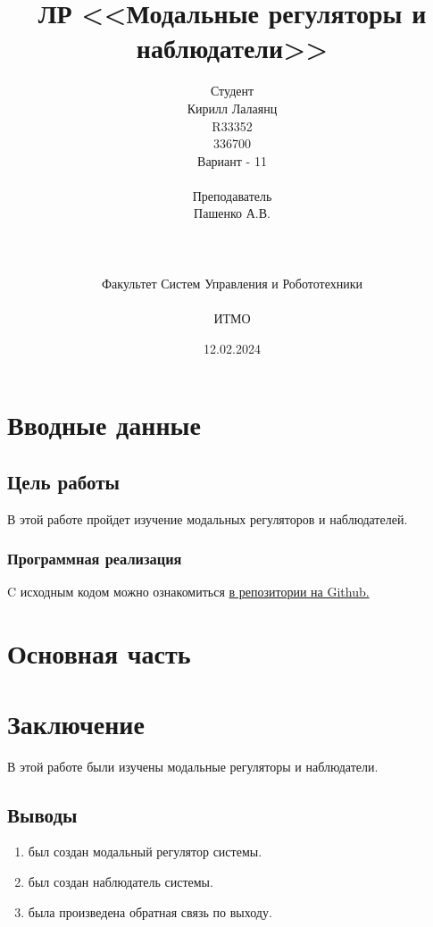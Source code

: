 \documentclass[16pt]{article}
\title{ЛР \textnumero 8 <<Модальные регуляторы и наблюдатели>>}
\author{
Студент \\
Кирилл Лалаянц\\
R33352\\
336700\\
Вариант - 11\\
\\
Преподаватель\\
Пашенко А.В. \\
\\
\\
\\
Факультет Систем Управления и Робототехники\\
\\
ИТМО\\
}
\date{12.02.2024}
\begin{document}
\maketitle
\newpage
\tableofcontents
\thispagestyle{empty}

\newpage
\setcounter{page}{1}
\section{Вводные данные}
\subsection{Цель работы}
В этой работе пройдет изучение модальных регуляторов и наблюдателей.


\subsubsection{Программная реализация}
C исходным кодом можно ознакомиться \href{https://github.com/lalayants/control-theory-itmo-2023-2024}{в репозитории на Github.}
\newpage
\section{Основная часть}

\FloatBarrier
\newpage

\FloatBarrier
\newpage

\FloatBarrier


\newpage
\section{Заключение}
В этой работе были изучены модальные регуляторы и наблюдатели.
\subsection{Выводы}
\begin{enumerate}
   \item был создан модальный регулятор системы. 
   \item был создан наблюдатель системы.
   \item была произведена обратная связь по выходу.
\end{enumerate}
\end{document}
